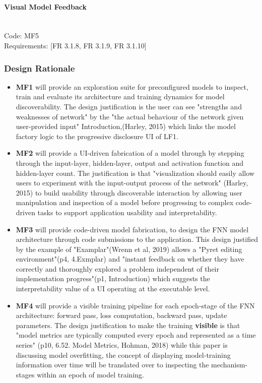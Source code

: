 \documentclass{article}
\begin{document}
\paragraph{Visual Model Feedback} \mbox{} \\
\noindent Code: MF5 \\
\noindent Requirements: [FR 3.1.8, FR 3.1.9, FR 3.1.10]

\subsubsection{Design Rationale}
\begin{itemize}
\item \textbf{MF1} will provide an exploration suite for preconfigured models to inspect, train and evaluate its architecture and training dynamics for model discoverability. The design justification is the user can see "strengths and weaknesses of network" by the "the actual behaviour of the network given user-provided input" Introduction,(Harley, 2015) which links the model factory logic to the progressive disclosure UI of LF1.

\item \textbf{MF2} will provide a UI-driven fabrication of a model through by stepping through the input-layer, hidden-layer, output and activation function and hidden-layer count. The justification is that "visualization should easily allow users to experiment with the input-output process of the network" (Harley, 2015) to build usability through discoverable interaction by allowing user manipulation and inspection of a model before progressing to complex code-driven tasks to support application usability and interpretability.

\item \textbf{MF3} will provide code-driven model fabrication, to design the FNN model architecture through code submissions to the application. This design justified by the example of "Examplar"(Wrenn et al, 2019) allows a "Pyret editing environment"(p4, 4.Exmplar) and "instant feedback on whether they have correctly and thoroughly explored a problem independent of their implementation progress"(p1, Introduction) which suggests the interpretability value of a UI operating at the executable level. %

\item \textbf{MF4} will provide a visible training pipeline for each epoch-stage of the FNN architecture: forward pass, loss computation, backward pass, update parameters. The design justification to make the training \textbf{visible} is that "model metrics are typically computed every epoch and represented as a time series" (p10, 6.52. Model Metrics, Hohman, 2018) while this paper is discussing model overfitting, the concept of displaying model-training information over time will be translated over to inspecting the mechanism-stages within an epoch of model training.


\end{itemize}
\end{document}
